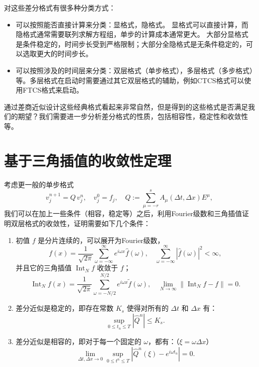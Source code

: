 对这些差分格式有很多种分类方式：
\begin{itemize}
    \item 可以按照能否直接计算来分类：显格式，隐格式。
          显格式可以直接计算，而隐格式通常需要联列求解方程组，单步的计算成本通常更大。
          大部分显格式是条件稳定的，时间步长受到严格限制；大部分全隐格式是无条件稳定的，可以选取更大的时间步长。
    \item 可以按照涉及的时间层来分类：双层格式（单步格式），多层格式（多步格式）等。多层格式在启动时需要通过其它双层格式的辅助，例如CTCS格式可以使用FTCS格式来启动。
\end{itemize}

通过差商近似设计这些经典格式看起来非常自然，但是得到的这些格式是否满足我们的期望？我们需要进一步分析差分格式的性质，包括相容性，稳定性和收敛性等。

\section{基于三角插值的收敛性定理}

考虑更一般的单步格式
\[
    v_j^{n+1} = Q\,v_j^n, \quad v_j^0 = f_j,\quad Q := \sum_{\mu = -r}^s A_\mu(\Delta t,\Delta x) E^\mu,
\]
我们可以在加上一些条件（相容，稳定等）之后，利用Fourier级数和三角插值证明双层格式的收敛性，证明需要如下几个条件：
\begin{enumerate}
    \item[(a)] 初值 $f$ 是分片连续的，可以展开为Fourier级数，
          \[
              f(x) = \frac{1}{\sqrt{2\pi}} \sum_{\omega = -\infty}^{\infty} e^{i \omega  x} \hat{f}(\omega ),\quad \sum_{\omega = -\infty}^{\infty} |\hat{f}(\omega )|^2 < \infty,
          \]
          并且它的三角插值 $\operatorname{Int}_N f$ 收敛于 $f$；
          \[
              \operatorname{Int}_N f (x) = \frac{1}{\sqrt{2\pi}} \sum_{\omega = -N/2}^{N/2} e^{i \omega  x} \tilde{f}(\omega ),
              \quad \lim_{N \to \infty} \| \operatorname{Int}_N f  - f \| = 0.
          \]
    \item[(b)] 差分近似是稳定的，即存在常数 $K_s$ 使得对所有的 $\Delta t$ 和 $\Delta x$ 有：
          \[
              \sup_{0 \le t_n \le T} |\widehat{Q}^n| \le K_s.
          \]
    \item[(c)] 差分近似是相容的，即对于每一个固定的 $\omega $，都有：（$\xi = \omega \Delta x$）
          \[
              \lim_{\Delta t,\Delta x \to 0} \sup_{0 \le t^n \le T} |\widehat{Q}^n(\xi) - e^{i \omega  t_n}| = 0.
          \]
\end{enumerate}

